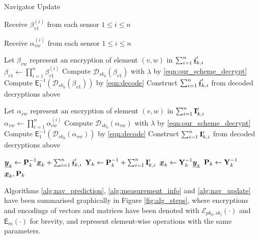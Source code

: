 \documentclass[twocolumn]{autart}
\begin{document}
\begin{algorithm}[htbp]
\caption{Navigator Update}\label{alg:nav_update}
\begin{algorithmic}[1]
    
        \State Receive $\beta_{v1}^{(i)}$ from each sensor $1\leq i \leq n$
    \EndFor

        \State Receive $\alpha_{vw}^{(i)}$ from each sensor $1\leq i \leq n$
        \EndFor
    \EndFor

    \State Let $\beta_{vw}$ represent an encryption of element $(v,w)$ in $\sum_{i=1}^n{\boldsymbol{\underline{i}}}'_{k,i}$
        \State $\beta_{v1} \gets \prod_{i=1}^n\beta_{v1}^{(i)}$
        \State Compute $\mathcal{D}_{sk_0}(\beta_{v1})$ with $\lambda$ by \eqref{eqn:our_scheme_decrypt}
        \State Compute $\mathsf{E}^{-1}_{1}(\mathcal{D}_{sk_0}(\beta_{v1}))$ by \eqref{eqn:decode}
    \EndFor
    \State Construct $\sum_{i=1}^n{\boldsymbol{\underline{i}}}'_{k,i}$ from decoded decryptions above

    \State Let $\alpha_{vw}$ represent an encryption of element $(v,w)$ in $\sum_{i=1}^n{{\mathbf{I}}}'_{k,i}$
            \State $\alpha_{vw} \gets \prod_{i=1}^n\alpha_{vw}^{(i)}$
            \State Compute $\mathcal{D}_{sk_0}(\alpha_{vw})$ with $\lambda$ by \eqref{eqn:our_scheme_decrypt}
            \State Compute $\mathsf{E}^{-1}_{1}(\mathcal{D}_{sk_0}(\alpha_{vw}))$ by \eqref{eqn:decode}
        \EndFor
    \EndFor
    \State Construct $\sum_{i=1}^n{{\mathbf{I}}}'_{k,i}$ from decoded decryptions above

    \State ${\boldsymbol{\underline{y}}}_k \gets {\ensuremath{{\mathbf{P}}}}_{k}^{-1}{\boldsymbol{\underline{x}}}_{k} + \sum_{i=1}^n{\boldsymbol{\underline{i}}}'_{k,i}$
    \State ${{\mathbf{Y}}}_k \gets {\ensuremath{{\mathbf{P}}}}_{k}^{-1} + \sum_{i=1}^n{{\mathbf{I}}}'_{k,i}$
    \State ${\boldsymbol{\underline{x}}}_{k} \gets {\ensuremath{{\mathbf{Y}}}}_k^{-1}{\boldsymbol{\underline{y}}}_k$
    \State ${{\mathbf{P}}}_{k} \gets {\ensuremath{{\mathbf{Y}}}}_k^{-1}$
    \State \Return ${\boldsymbol{\underline{x}}}_{k}, {{\mathbf{P}}}_{k}$
    \EndProcedure
\end{algorithmic}
\end{algorithm}

Algorithms \ref{alg:nav_prediction}, \ref{alg:measurement_info} and \ref{alg:nav_update} have been summarised graphically in Figure \ref{fig:alg_steps}, where encryptions and encodings of vectors and matrices have been denoted with $\mathcal{E}_{pk_0,sk_i}(\cdot)$ and $\mathsf{E}_m(\cdot)$ for brevity, and represent element-wise operations with the same parameters.
\end{document}
